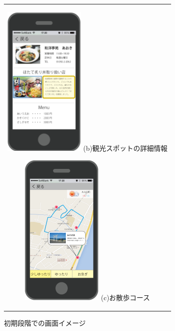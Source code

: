 \begin{figure}[htbp]
\begin{center}
\begin{tabular}{c}
      \begin{minipage}{0.33\hsize}
        \begin{center}
\includegraphics[width=4cm, bb=0 0 304 570]{5.2_map2.png}
          \hspace{1cm}%
          {\footnotesize (b)観光スポットの詳細情報}
        \end{center}
      \end{minipage}

      \begin{minipage}{0.33\hsize}
        \begin{center}
\includegraphics[width=4cm, bb=0 0 302 572]{5.2_sanpo.png}
          \hspace{1cm} %
          {\footnotesize (c)お散歩コース}
        \end{center}
      \end{minipage}

    \end{tabular}
    \caption{初期段階での画面イメージ}
    \label{fig:lena}
  \end{center}
\end{figure}

